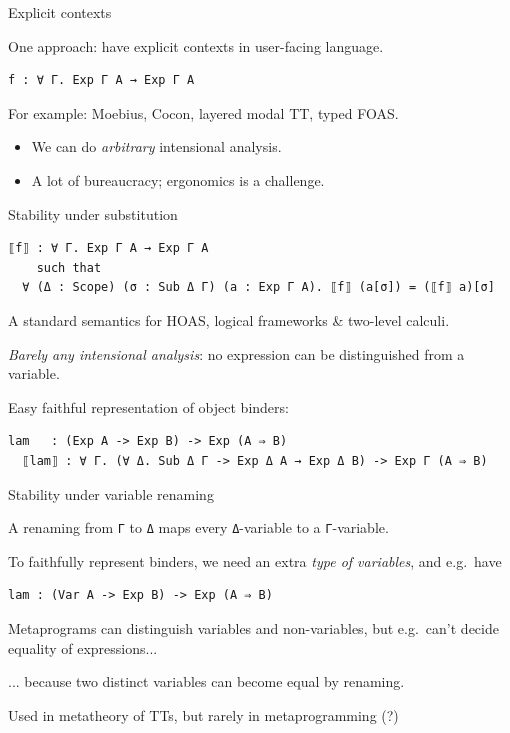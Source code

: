 \documentclass[dvipsnames,aspectratio=169]{beamer}
\newcommand{\vsp}{\vspace{1em}}
\theoremstyle{remark}
\begin{document}
\begin{frame}[fragile]{Explicit contexts}

One approach: have explicit contexts in user-facing language.
\vsp
\begin{Verbatim}[commandchars=\\\{\}]
  f : ∀ Γ. Exp Γ A → Exp Γ A
\end{Verbatim}
\vsp
For example: Moebius, Cocon, layered modal TT, typed FOAS.
\vsp

\begin{itemize}
\item We can do \emph{arbitrary} intensional analysis.
\item A lot of bureaucracy; ergonomics is a challenge.
\end{itemize}

\end{frame}


\begin{frame}[fragile]{Stability under substitution}

\begin{Verbatim}[commandchars=\\\{\}]
  ⟦f⟧ : ∀ Γ. Exp Γ A → Exp Γ A
    such that
  ∀ (Δ : Scope) (σ : Sub Δ Γ) (a : Exp Γ A). ⟦f⟧ (a[σ]) = (⟦f⟧ a)[σ]
\end{Verbatim}
\vsp
A standard semantics for HOAS, logical frameworks \& two-level calculi.
\vsp

\emph{Barely any intensional analysis}: no expression can be distinguished from
a variable.

\vsp
Easy faithful representation of object binders:
\begin{Verbatim}[commandchars=\\\{\}]
  lam   : (Exp A -> Exp B) -> Exp (A ⇒ B)
  ⟦lam⟧ : ∀ Γ. (∀ Δ. Sub Δ Γ -> Exp Δ A → Exp Δ B) -> Exp Γ (A ⇒ B)
\end{Verbatim}

\end{frame}

\begin{frame}[fragile]{Stability under variable renaming}

A renaming from \texttt{Γ} to \texttt{Δ} maps every \texttt{Δ}-variable to
a \texttt{Γ}-variable.
\vsp

To faithfully represent binders, we need an extra \emph{type of variables}, and e.g.\ have
\vsp
\begin{Verbatim}[commandchars=\\\{\}]
  lam : (Var A -> Exp B) -> Exp (A ⇒ B)
\end{Verbatim}
\vsp

Metaprograms can distinguish variables and non-variables, but e.g.\ can't decide equality
of expressions...

\vsp
... because two distinct variables can become equal by renaming.

\vsp
Used in metatheory of TTs, but rarely in metaprogramming (?)

\end{frame}
\end{document}

